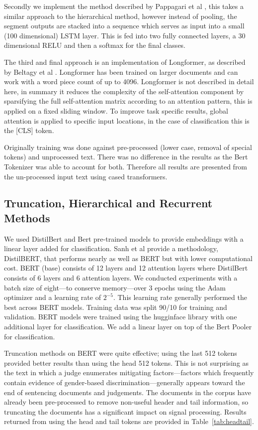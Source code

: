 \documentclass[twocolumn,10pt]{wmrDoc}
\begin{document}
Secondly we implement the method described by Pappagari et al \cite{Pappagari}, this takes a similar approach to the hierarchical method, however instead of pooling, the segment outputs are stacked into a sequence which serves as input into a small (100 dimensional) LSTM layer. This is fed into two fully connected layers, a 30 dimensional RELU and then a softmax for the final classes.

The third and final approach is an implementation of Longformer, as described by Beltagy et al \cite{longformer}. Longformer has been trained on larger documents and can work with a word piece count of up to 4096. Longformer is not described in detail here, in summary it reduces the complexity of the self-attention component by sparsifying the full self-attention matrix according to an attention pattern, this is applied on a fixed sliding window. To improve task specific results, global attention is applied to specific input locations, in the case of classification this is the [CLS] token.

Originally training was done against pre-processed (lower case, removal of special tokens) and unprocessed text. There was no difference in the results as the Bert Tokenizer was able to account for both. Therefore all results are presented from the un-processed input text using cased transformers. 

\subsection{Truncation, Hierarchical and Recurrent Methods }
We used DistilBert and Bert pre-trained models to provide embeddings with a linear layer added for classification. Sanh et al \cite{sanh} provide a methodology, DistilBERT, that performs nearly as well as BERT but with lower computational cost. BERT (base) consists of 12 layers and 12 attention layers where DistilBert consists of 6 layers and 6 attention layers. We conducted experiments with a batch size of eight---to conserve memory---over 3 epochs using the Adam optimizer and a learning rate of $2^{-5}$.  This learning rate generally performed the best across BERT models. Training data was split 90/10 for training and validation.  BERT models were trained using the hugginface library with one additional layer for classification. We add a linear layer on top of the Bert Pooler for classification.

Truncation methods on BERT were quite effective; using the last 512 tokens provided better results than using the head 512 tokens. This is not surprising as the text in which a judge enumerates mitigating factors---factors which frequently contain evidence of gender-based discrimination---generally appears toward the end of sentencing documents and judgements.  The documents in the corpus have already been pre-processed to remove non-useful header and tail information, so truncating the documents has a significant impact on signal processing.  Results returned from using the head and tail tokens are provided in Table~\ref{tab:headtail}.
\end{document}
